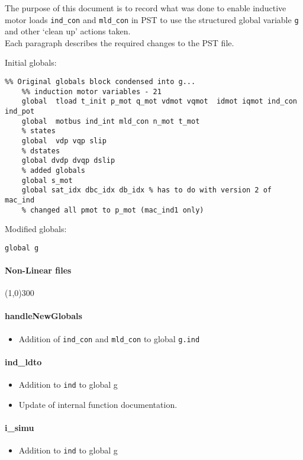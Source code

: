 \documentclass[12pt]{article}
\begin{document}
The purpose of this document is to record what was done to enable inductive motor loads \verb|ind_con| and \verb|mld_con| in PST to use the structured global variable \verb|g| and other `clean up' actions taken. \\
Each paragraph describes the required changes to the PST file.

Initial globals:
\begin{verbatim}
%% Original globals block condensed into g...
    %% induction motor variables - 21
    global  tload t_init p_mot q_mot vdmot vqmot  idmot iqmot ind_con ind_pot
    global  motbus ind_int mld_con n_mot t_mot
    % states
    global  vdp vqp slip
    % dstates
    global dvdp dvqp dslip
    % added globals
    global s_mot
    global sat_idx dbc_idx db_idx % has to do with version 2 of mac_ind
    % changed all pmot to p_mot (mac_ind1 only)
\end{verbatim}

Modified globals:
\begin{verbatim}
global g
\end{verbatim}
\paragraph{Non-Linear files}\line(1,0){300}
\paragraph{handleNewGlobals}
	\begin{itemize}
		\item Addition of \verb|ind_con| and \verb|mld_con| to global \verb|g.ind|
	\end{itemize}
\paragraph{ind\_ldto}
	\begin{itemize}
		\item Addition to \verb|ind| to global g
		\item Update of internal function documentation.
	\end{itemize}

\paragraph{i\_simu}
	\begin{itemize}
		\item Addition to \verb|ind| to global g
	\end{itemize}
\end{document}
